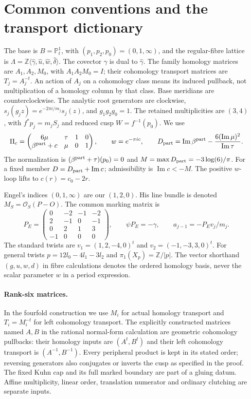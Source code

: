 \section{Common conventions and the transport dictionary}\label{sec:III:conventions}
The base is $B=\mathbb P^1_t$, with $(p_1,p_2,p_0)=(0,1,\infty)$,
and the regular-fibre lattice is
$\Lambda=\mathbb Z\langle\widehat\gamma,\widehat u,\widehat w,\widehat\delta\rangle$.
The covector $\gamma$ is dual to $\widehat\gamma$.
The family homology matrices are $A_1,A_2,M_0$, with
$A_1A_2M_0=I$; their cohomology transport matrices are
$T_j=A_j^{-t}$. An action of $A_j$ on a cohomology class means its
induced pullback, not multiplication of a homology column by that class.
Base meridians are counterclockwise. The analytic root generators are
clockwise, $s_j(g_jz)=e^{-2\pi i/m_j}s_j(z)$, and
$g_1g_2g_0=1$. The retained multiplicities are $(3,4)$, with
$f^*p_j=m_jS_j$ and reduced cusp $W=f^{-1}(p_0)$.
We use
\[
\Pi_c=\begin{pmatrix}6\mu&\tau&1&0\\\beta^{\rm part}+c&\mu&0&1\end{pmatrix},
\qquad w=e^{-\pi i c},\qquad
D_{\rm part}=\operatorname{Im}\beta^{\rm part}
-\frac{6(\operatorname{Im}\mu)^2}{\operatorname{Im}\tau}.
\]
The normalization is $(\beta^{\rm part}+\tau)(p_0)=0$ and
$M=\max D_{\rm part}=-3\log(6)/\pi$.
For a fixed member $D=D_{\rm part}+\operatorname{Im}c$;
admissibility is $\operatorname{Im}c<-M$.
The positive $w$-loop lifts to $c(r)=c_0-2r$.

Engel's indices $(0,1,\infty)$ are our $(1,2,0)$.
His line bundle is denoted $M_S=\mathcal O_S(P-O)$.
The common marking matrix is
\[
P_E=\begin{pmatrix}0&-2&-1&-2\\2&-1&0&-1\\0&2&1&3\\-1&0&0&0\end{pmatrix},
\qquad \psi P_E=-\gamma,\qquad a_{j-1}=-P_Ev_j/m_j.
\]
The standard twists are $v_1=(1,2,-4,0)^t$ and
$v_2=(-1,-3,3,0)^t$. For general twists
$p=12l_0-4l_1-3l_2$ and $\pi_1(X_p)=\mathbb Z/|p|$.
The vector shorthand $(g,u,w,d)$ in fibre calculations denotes the ordered
homology basis, never the scalar parameter $w$ in a period expression.

\paragraph{Rank-six matrices.}
In the fourfold construction we use $M_i$ for actual homology transport
and $T_i=M_i^{-t}$ for left cohomology transport. The explicitly constructed
matrices named $A,B$ in the rational normal-form calculation are geometric
cohomology pullbacks: their homology inputs are $(A^t,B^t)$ and their left
cohomology transport is $(A^{-1},B^{-1})$. Every peripheral product is kept
in its stated order; reversing generators also conjugates or inverts the
cusp as specified in the proof. The fixed Kuhn cap and its full marked
boundary are part of a gluing datum. Affine multiplicity, linear order,
translation numerator and ordinary clutching are separate inputs.

